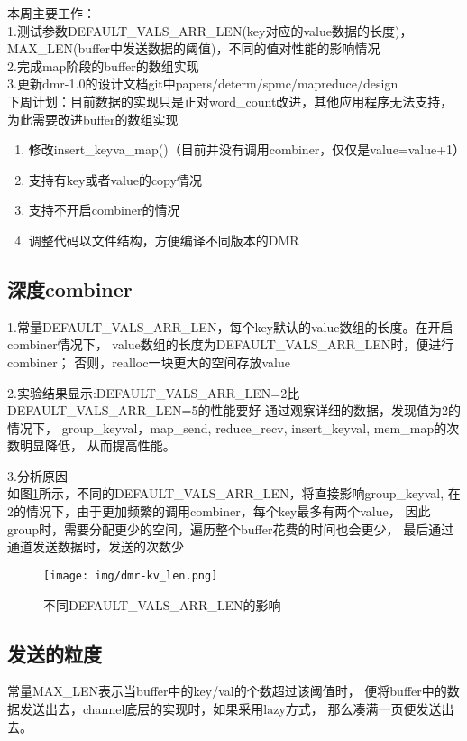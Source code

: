 
本周主要工作：\\
  1.测试参数DEFAULT\_VALS\_ARR\_LEN(key对应的value数据的长度)，
  MAX\_LEN(buffer中发送数据的阈值)，不同的值对性能的影响情况\\
  2.完成map阶段的buffer的数组实现\\
  3.更新dmr-1.0的设计文档git中papers/determ/spmc/mapreduce/design\\

{\color{red}下周计划：}目前数据的实现只是正对word\_count改进，其他应用程序无法支持，
为此需要改进buffer的数组实现
\begin{enumerate}
  \item 修改insert\_keyva\_map()（目前并没有调用combiner，仅仅是value=value+1）
  \item 支持有key或者value的copy情况
  \item 支持不开启combiner的情况
  \item 调整代码以文件结构，方便编译不同版本的DMR
\end{enumerate}

\subsection{深度combiner}
1.常量DEFAULT\_VALS\_ARR\_LEN，每个key默认的value数组的长度。在开启combiner情况下，
value数组的长度为DEFAULT\_VALS\_ARR\_LEN时，便进行combiner；
否则，realloc一块更大的空间存放value

2.实验结果显示:DEFAULT\_VALS\_ARR\_LEN=2比DEFAULT\_VALS\_ARR\_LEN=5的性能要好
通过观察详细的数据，发现值为2的情况下，
group\_keyval，map\_send, reduce\_recv, insert\_keyval, mem\_map的次数明显降低，
从而提高性能。

3.分析原因\\
如图\ref{kv_len}所示，不同的DEFAULT\_VALS\_ARR\_LEN，将直接影响group\_keyval,
在2的情况下，由于更加频繁的调用combiner，每个key最多有两个value，
因此group时，需要分配更少的空间，遍历整个buffer花费的时间也会更少，
最后通过通道发送数据时，发送的次数少
\begin{figure}[!h]
    \centering
    \texttt{[image: img/dmr-kv\_len.png]}
    \caption{不同DEFAULT\_VALS\_ARR\_LEN的影响}
\label{kv_len}
\end{figure}


\subsection{发送的粒度}
常量MAX\_LEN表示当buffer中的key/val的个数超过该阈值时，
便将buffer中的数据发送出去，channel底层的实现时，如果采用lazy方式，
那么凑满一页便发送出去。

